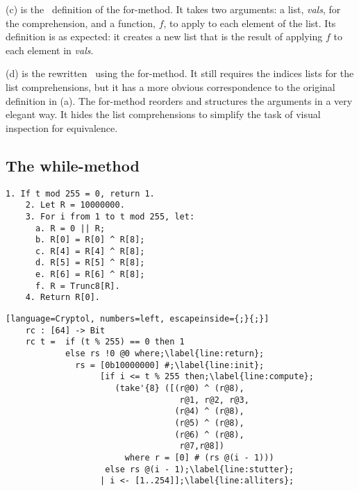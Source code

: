 (c) is the \cryptol\ definition of the for-method.
It takes two arguments: a list, \emph{vals}, for the comprehension, and a function, $f$, to apply to each element of the list.
Its definition is as expected: it creates a new list that is the result of applying $f$ to each element in \emph{vals}.

(d) is the rewritten \cryptol\ using the for-method.
It still requires the indices lists for the list comprehensions, but it has a more obvious correspondence to the original definition in (a).
The for-method reorders and structures the arguments in a very elegant way.
It hides the list comprehensions to simplify the task of visual inspection for equivalence.

\subsection{The while-method}

\newsavebox{\fipsRc}
\begin{lrbox}{\fipsRc}
  \begin{lstlisting}[basewidth = {.5em},basicstyle={\small}]
    1. If t mod 255 = 0, return 1.
    2. Let R = 10000000.
    3. For i from 1 to t mod 255, let:
      a. R = 0 || R;
      b. R[0] = R[0] ^ R[8];
      c. R[4] = R[4] ^ R[8];
      d. R[5] = R[5] ^ R[8];
      e. R[6] = R[6] ^ R[8];
      f. R = Trunc8[R].
    4. Return R[0].
  \end{lstlisting}
\end{lrbox}

\newsavebox{\RcCry}
\begin{lrbox}{\RcCry}
  \begin{lstlisting}[language=Cryptol, numbers=left, escapeinside={;}{;}]
    rc : [64] -> Bit
    rc t =  if (t % 255) == 0 then 1
            else rs !0 @0 where;\label{line:return};
              rs = [0b10000000] #;\label{line:init};
                   [if i <= t % 255 then;\label{line:compute};
                      (take'{8} ([(r@0) ^ (r@8),
                                   r@1, r@2, r@3, 
                                  (r@4) ^ (r@8),
                                  (r@5) ^ (r@8),
                                  (r@6) ^ (r@8),
                                   r@7,r@8])
                        where r = [0] # (rs @(i - 1)))
                    else rs @(i - 1);\label{line:stutter};
                   | i <- [1..254]];\label{line:alliters};
  \end{lstlisting}
\end{lrbox}

